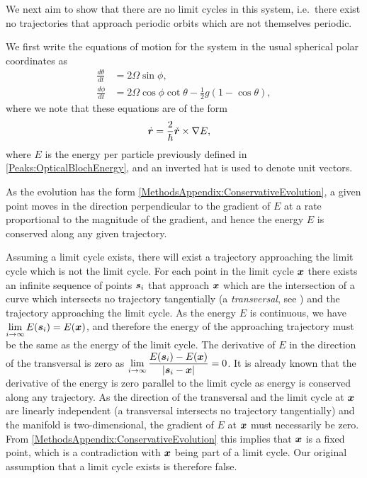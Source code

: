 We next aim to show that there are no limit cycles in this system, i.e.\ there exist no trajectories that approach periodic orbits which are not themselves periodic.

We first write the equations of motion for the system in the usual spherical polar coordinates as
\begin{subequations}
    \label{MethodsAppendix:EvolutionOfAngles}
    \begin{align}
        \frac{d \theta}{dt} &= 2 \Omega \sin\phi, \label{MethodsAppendix:EvolutionOfAngles:Theta}\\
        \frac{d \phi}{dt} &= 2 \Omega \cos\phi \cot\theta - \frac{1}{2} g (1-\cos\theta), \label{MethodsAppendix:EvolutionOfAngles:Phi}
    \end{align}
\end{subequations}
where we note that these equations are of the form
\begin{align}
    \dot{\vect{r}} &= \frac{2}{\hbar} \unitvec{r} \times \nabla E, \label{MethodsAppendix:ConservativeEvolution}
\end{align}
where $E$ is the energy per particle previously defined in \eqref{Peaks:OpticalBlochEnergy}, and an inverted hat is used to denote unit vectors.

As the evolution has the form \eqref{MethodsAppendix:ConservativeEvolution}, a given point moves in the direction perpendicular to the gradient of $E$ at a rate proportional to the magnitude of the gradient, and hence the energy $E$ is conserved along any given trajectory.

Assuming a limit cycle exists, there will exist a trajectory approaching the limit cycle which is not the limit cycle. For each point in the limit cycle $\bm{x}$ there exists an infinite sequence of points $\bm{s}_i$ that approach $\bm{x}$ which are the intersection of a curve which intersects no trajectory tangentially (a \emph{transversal}, see \citep{Schwartz:1963}) and the trajectory approaching the limit cycle.  As the energy $E$ is continuous, we have $\displaystyle \lim_{i\rightarrow\infty}E(\bm{s}_i) = E(\bm{x})$, and therefore the energy of the approaching trajectory must be the same as the energy of the limit cycle.  The derivative of $E$ in the direction of the transversal is zero as $\displaystyle \lim_{i\rightarrow\infty} \frac{E(\bm{s}_i) - E(\bm{x})}{\left|\bm{s}_i - \bm{x}\right|} = 0$.  It is already known that the derivative of the energy is zero parallel to the limit cycle as energy is conserved along any trajectory. As the direction of the transversal and the limit cycle at $\bm{x}$ are linearly independent (a transversal intersects no trajectory tangentially) and the manifold is two-dimensional, the gradient of $E$ at $\bm{x}$ must necessarily be zero.  From \eqref{MethodsAppendix:ConservativeEvolution} this implies that $\bm{x}$ is a fixed point, which is a contradiction with $\bm{x}$ being part of a limit cycle.  Our original assumption that a limit cycle exists is therefore false.

